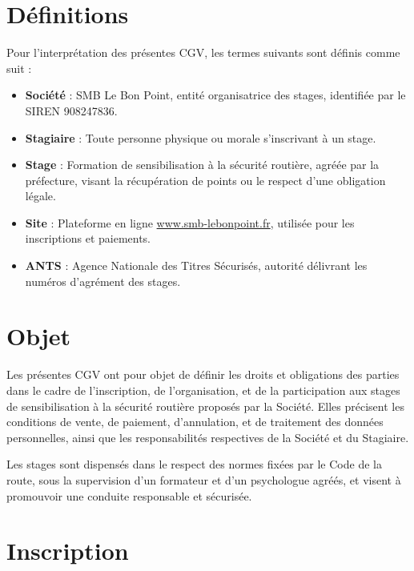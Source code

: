 \documentclass[a4paper,12pt]{article}
\begin{document}
\section{Définitions}
Pour l'interprétation des présentes CGV, les termes suivants sont définis comme suit :
\begin{itemize}
    \item \textbf{Société} : SMB Le Bon Point, entité organisatrice des stages, identifiée par le SIREN 908247836.
    \item \textbf{Stagiaire} : Toute personne physique ou morale s'inscrivant à un stage.
    \item \textbf{Stage} : Formation de sensibilisation à la sécurité routière, agréée par la préfecture, visant la récupération de points ou le respect d'une obligation légale.
    \item \textbf{Site} : Plateforme en ligne \href{https://www.smb-lebonpoint.fr}{www.smb-lebonpoint.fr}, utilisée pour les inscriptions et paiements.
    \item \textbf{ANTS} : Agence Nationale des Titres Sécurisés, autorité délivrant les numéros d'agrément des stages.
\end{itemize}

\section{Objet}
Les présentes CGV ont pour objet de définir les droits et obligations des parties dans le cadre de l'inscription, de l'organisation, et de la participation aux stages de sensibilisation à la sécurité routière proposés par la Société. Elles précisent les conditions de vente, de paiement, d'annulation, et de traitement des données personnelles, ainsi que les responsabilités respectives de la Société et du Stagiaire. 

Les stages sont dispensés dans le respect des normes fixées par le Code de la route, sous la supervision d'un formateur et d'un psychologue agréés, et visent à promouvoir une conduite responsable et sécurisée.

\section{Inscription}
\end{document}
